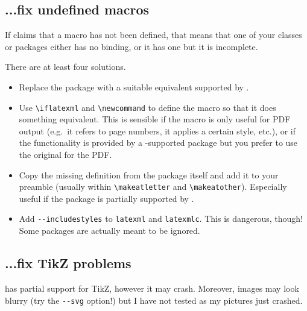 \documentclass[a4paper]{article}
\def\ltxinline{\lstinline[style=latexml]}
\theoremstyle{definition}
\begin{document}
\subsection{...fix undefined macros}
If \LaTeXML{} claims that a macro has not been defined, that means that one of your classes or packages either has no \LaTeXML{} binding, or it has one but it is incomplete.

There are at least four solutions.
\begin{itemize}
  \item Replace the package with a suitable equivalent supported by \LaTeXML{}.
  \item Use \ltxinline|\iflatexml| and \ltxinline|\newcommand| to define the macro so that it does something equivalent. This is sensible if the macro is only useful for PDF output (e.g.\ it refers to page numbers, it applies a certain style, etc.), or if the functionality is provided by a \LaTeXML{}-supported package but you prefer to use the original for the PDF.
  \item Copy the missing definition from the package itself and add it to your preamble (usually within \ltxinline|\makeatletter| and \ltxinline|\makeatother|). Especially useful if the package is partially supported by \LaTeXML{}.
  \item Add \verb|--includestyles| to \verb|latexml| and \verb|latexmlc|. This is dangerous, though! Some packages are actually meant to be ignored.
\end{itemize}

\subsection{...fix TikZ problems}
\LaTeXML{} has partial support for TikZ, however it may crash. Moreover, images may look blurry (try the \verb|--svg| option!) but I have not tested as my pictures just crashed.
\end{document}
